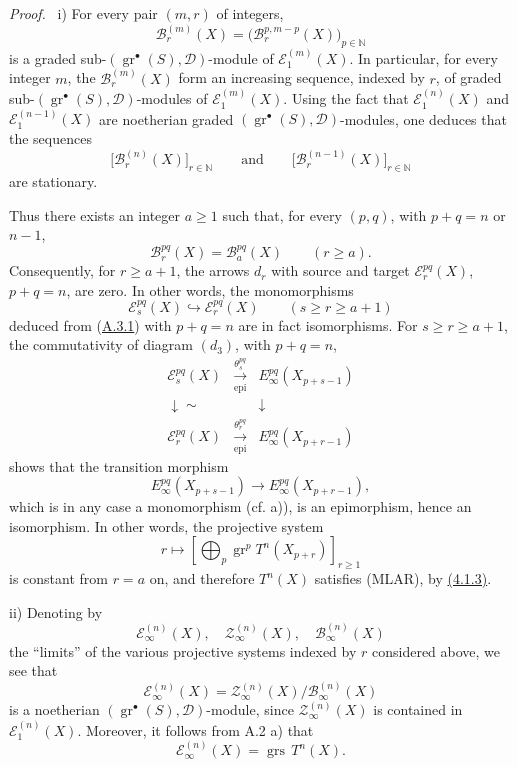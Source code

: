 \documentclass[11pt]{article}
\newenvironment{prooftext}[1][Proof]{\par\noindent\emph{#1.}\ }{\par\medskip}
\providecommand{\gr}{\operatorname{gr}}
\providecommand{\gr}{\operatorname{gr}}
\providecommand{\gr}{\operatorname{gr}}
\providecommand{\grs}{\operatorname{grs}}
\providecommand{\epi}{\operatorname{epi}}
\begin{document}
\begin{prooftext}
i) For every pair \((m,r)\) of integers,
\[
\mathcal B_r^{(m)}(X)=\bigl(\mathcal B_r^{p,m-p}(X)\bigr)_{p\in\mathbb N}
\]
is a graded sub-\((\gr^\bullet(S),\mathcal D)\)-module of \(\mathcal E_1^{(m)}(X)\). In particular, for every integer \(m\), the \(\mathcal B_r^{(m)}(X)\) form an increasing sequence, indexed by \(r\), of graded sub-\((\gr^\bullet(S),\mathcal D)\)-modules of \(\mathcal E_1^{(m)}(X)\). Using the fact that \(\mathcal E_1^{(n)}(X)\) and \(\mathcal E_1^{(n-1)}(X)\) are noetherian graded \((\gr^\bullet(S),\mathcal D)\)-modules, one deduces that the sequences
\[
\bigl[\mathcal B_r^{(n)}(X)\bigr]_{r\in\mathbb N}
\qquad\text{and}\qquad
\bigl[\mathcal B_r^{(n-1)}(X)\bigr]_{r\in\mathbb N}
\]
are stationary.

Thus there exists an integer \(a\ge1\) such that, for every \((p,q)\), with \(p+q=n\) or \(n-1\),
\begin{equation}
\mathcal B_r^{pq}(X)=\mathcal B_a^{pq}(X)\qquad(r\ge a).
\tag{A.3.1}\label{sga5:V:equation:a.3.1}
\end{equation}
Consequently, for \(r\ge a+1\), the arrows \(d_r\) with source and target \(\mathcal E_r^{pq}(X)\), \(p+q=n\), are zero. In other words, the monomorphisms
\[
\mathcal E_s^{pq}(X)\hookrightarrow\mathcal E_r^{pq}(X)\qquad(s\ge r\ge a+1)
\]
deduced from (\hyperref[sga5:V:equation:a.3.1]{A.3.1}) with \(p+q=n\) are in fact isomorphisms. For \(s\ge r\ge a+1\), the commutativity of diagram \((d_3)\), with \(p+q=n\),
\[
\begin{array}{ccc}
\mathcal E_s^{pq}(X)&\xrightarrow[\epi]{\theta_s^{pq}}&E_\infty^{pq}(X_{p+s-1})\\
\downarrow\sim&&\downarrow\\
\mathcal E_r^{pq}(X)&\xrightarrow[\epi]{\theta_r^{pq}}&E_\infty^{pq}(X_{p+r-1})
\end{array}
\]
shows that the transition morphism
\[
E_\infty^{pq}(X_{p+s-1})\longrightarrow E_\infty^{pq}(X_{p+r-1}),
\]
which is in any case a monomorphism (cf. a)), is an epimorphism, hence an isomorphism. In other words, the projective system
\[
r\longmapsto\left[\bigoplus_p\gr^p T^n(X_{p+r})\right]_{r\ge1}
\]
is constant from \(r=a\) on, and therefore \(T^n(X)\) satisfies (MLAR), by \hyperref[sga5:V:proposition:4.1.3]{(4.1.3)}.

ii) Denoting by
\[
\mathcal E_\infty^{(n)}(X),\quad
\mathcal Z_\infty^{(n)}(X),\quad
\mathcal B_\infty^{(n)}(X)
\]
the “limits” of the various projective systems indexed by \(r\) considered above, we see that
\[
\mathcal E_\infty^{(n)}(X)=
\mathcal Z_\infty^{(n)}(X)/\mathcal B_\infty^{(n)}(X)
\]
is a noetherian \((\gr^\bullet(S),\mathcal D)\)-module, since \(\mathcal Z_\infty^{(n)}(X)\) is contained in \(\mathcal E_1^{(n)}(X)\). Moreover, it follows from A.2 a) that
\[
\mathcal E_\infty^{(n)}(X)=\grs\,T^n(X).
\]
\end{prooftext}
\end{document}

